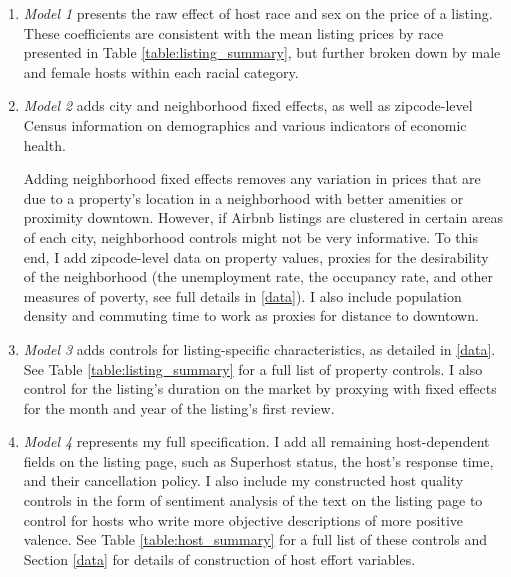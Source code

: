 \begin{enumerate}
	\item \textit{Model 1} presents the raw effect of host race and sex on the price of a listing. These coefficients are consistent with the mean listing prices by race presented in Table \ref{table:listing_summary}, but further broken down by male and female hosts within each racial category.
	
	\item \textit{Model 2} adds city and neighborhood fixed effects, as well as zipcode-level Census information on demographics and various indicators of economic health. 
	
	Adding neighborhood fixed effects removes any variation in prices that are due to a property's location in a neighborhood with better amenities or proximity downtown. However, if Airbnb listings are clustered in certain areas of each city, neighborhood controls might not be very informative. To this end, I add zipcode-level data on property values, proxies for the desirability of the neighborhood (the unemployment rate, the occupancy rate, and other measures of poverty, see full details in \ref{data}). I also include population density and commuting time to work as proxies for distance to downtown. 
		
	\item \textit{Model 3} adds controls for listing-specific characteristics, as detailed in \ref{data}. See Table \ref{table:listing_summary} for a full list of property controls. I also control for the listing's duration on the market by proxying with fixed effects for the month and year of the listing's first review.
	
	\item \textit{Model 4} represents my full specification. I add all remaining host-dependent fields on the listing page, such as Superhost status, the host's response time, and their cancellation policy. I also include my constructed host quality controls in the form of sentiment analysis of the text on the listing page to control for hosts who write more objective descriptions of more positive valence. See Table \ref{table:host_summary} for a full list of these controls and Section \ref{data} for details of construction of host effort variables. 
\end{enumerate}




